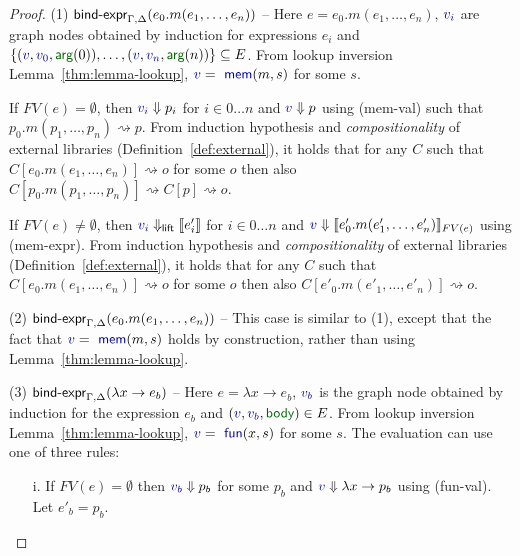 \documentclass[english,submission]{programming}
\theoremstyle{plain}
\theoremstyle{definition}
\newcommand{\ident}[1]{\textnormal{\textcolor{idclr}{\sffamily #1}}}
\newcommand{\bndclr}[1]{\textcolor{kvdclr}{#1}}
\newcommand{\bnd}[1]{\textnormal{\textcolor{kvdclr}{\sffamily #1}}}
\newcommand{\blbl}[1]{\textnormal{\textcolor{numclr}{\sffamily #1}}}
\newcommand{\rname}[1]{{\sffamily(#1)}}
\begin{document}
\begin{proof}
\vspace{0.75em}\noindent(1) $\ident{bind-expr}_{\Gamma, \Delta}(e_0.m(e_1, \ldots, e_n))$ --
  Here $e = e_0.m(e_1, \ldots, e_n)$, $\bndclr{v_i}$ are graph nodes obtained by induction for
  expressions $e_i$ and $\{ (\bndclr{v}, \bndclr{v_0}, \blbl{arg}(0)), \ldots, (\bndclr{v}, \bndclr{v_n}, \blbl{arg}(n))\} \subseteq E$.
  From lookup inversion Lemma~\ref{thm:lemma-lookup}, $\bndclr{v} = \bnd{mem}(m, s)$ for some $s$.

  If $FV(e)=\emptyset$, then $\bndclr{v_i} \Downarrow p_i$ for $i\in 0\ldots n$ and
  $\bndclr{v}\Downarrow p$ using \rname{mem-val} such that $p_0.m(p_1, \ldots, p_n) \rightsquigarrow p$.
  From induction hypothesis and \emph{compositionality} of external libraries (Definition~\ref{def:external}),
  it holds that for any $C$ such that $C[e_0.m(e_1, \ldots, e_n)] \rightsquigarrow o$ for some $o$
  then also $C[p_0.m(p_1, \ldots, p_n)] \rightsquigarrow C[p] \rightsquigarrow o$.

  If $FV(e)\neq\emptyset$, then $\bndclr{v_i} \Downarrow_\ident{lift} \llbracket e'_i \rrbracket$ for $i\in 0\ldots n$ and
  $\bndclr{v}\Downarrow \llbracket e'_0.m(e'_1, \ldots, e'_n) \rrbracket_{FV(e)}$ using \rname{mem-expr}.
  From induction hypothesis and \emph{compositionality} of external libraries (Definition~\ref{def:external}),
  it holds that for any $C$ such that $C[e_0.m(e_1, \ldots, e_n)] \rightsquigarrow o$ for some $o$
  then also $C[e'_0.m(e'_1, \ldots, e'_n)] \rightsquigarrow o$.

\vspace{0.75em}\noindent(2) $\ident{bind-expr}_{\Gamma, \Delta}(e_0.m(e_1, \ldots, e_n))$ --
  This case is similar to (1), except that the fact that $\bndclr{v} = \bnd{mem}(m, s)$
  holds by construction, rather than using Lemma~\ref{thm:lemma-lookup}.

\vspace{0.75em}\noindent(3) $\ident{bind-expr}_{\Gamma, \Delta}(\lambda x\rightarrow e_b)$ --
  Here $e = \lambda x\rightarrow e_b$, $\bndclr{v_b}$ is the graph node obtained by induction
  for the expression $e_b$ and $(\bndclr{v}, \bndclr{v_b}, \blbl{body}) \in E$.
  From lookup inversion Lemma~\ref{thm:lemma-lookup}, $\bndclr{v} = \bnd{fun}(x, s)$ for some $s$.
  The evaluation can use one of three rules:

  \begin{enumerate}
  \item[i.]
  If $FV(e)=\emptyset$ then $\bndclr{v_b}\Downarrow p_b$ for some $p_b$ and $\bndclr{v}\Downarrow \lambda x\rightarrow p_b$
  using \rname{fun-val}. Let $e'_b=p_b$.


\end{enumerate}
\end{proof}
\end{document}
